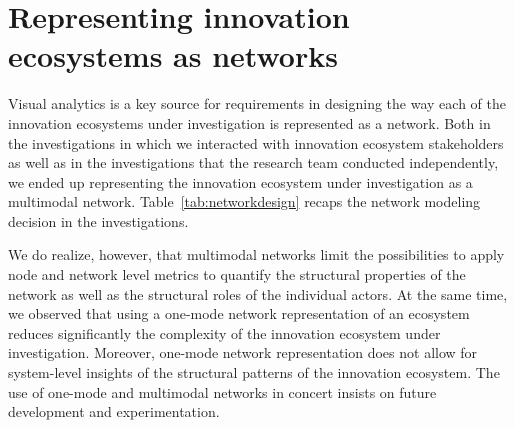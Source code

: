 \section{Representing innovation ecosystems as networks}
\label{sec:networkrepresentation}

Visual analytics is a key source for requirements in designing the way each of the innovation ecosystems under investigation is represented as a network. Both in the investigations in which we interacted with innovation ecosystem stakeholders as well as in the investigations that the research team conducted independently, we ended up representing the innovation ecosystem under investigation as a multimodal network. Table~\ref{tab:networkdesign} recaps the network modeling decision in the investigations.
  
We do realize, however, that multimodal networks limit the possibilities to apply node and network level metrics to quantify the structural properties of the network as well as the structural roles of the individual actors. At the same time, we observed that using a one-mode network representation of an ecosystem reduces significantly the complexity of the innovation ecosystem under investigation. Moreover, one-mode network representation does not allow for system-level insights of the structural patterns of the innovation ecosystem. The use of one-mode and multimodal networks in concert insists on future development and experimentation. 

